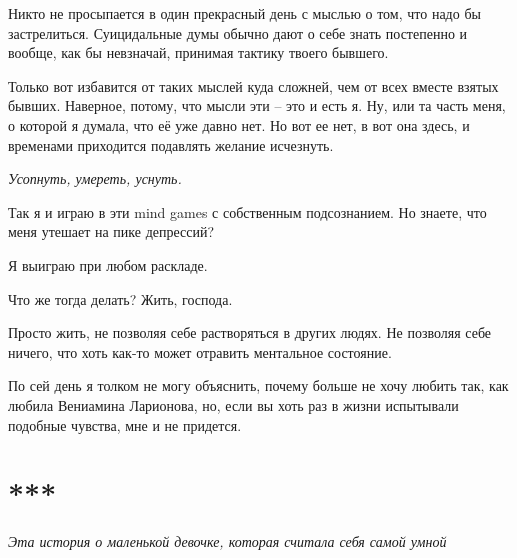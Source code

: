 \documentclass[
]{book}
\begin{document}
Никто не просыпается в один прекрасный день с мыслью о том, что надо бы застрелиться. Суицидальные думы обычно дают о себе знать постепенно и вообще, как бы невзначай, принимая тактику твоего бывшего.

Только вот избавится от таких мыслей куда сложней, чем от всех вместе взятых бывших. Наверное, потому, что мысли эти -- это и есть я. Ну, или та часть меня, о которой я думала, что её уже давно нет. Но вот ее нет, в вот она здесь, и временами приходится подавлять желание исчезнуть.

\emph{Усопнуть, умереть, уснуть.}

Так я и играю в эти mind games с собственным подсознанием. Но знаете, что меня утешает на пике депрессий?

Я выиграю при любом раскладе.

Что же тогда делать? Жить, господа.

Просто жить, не позволяя себе растворяться в других людях. Не позволяя себе ничего, что хоть как-то может отравить ментальное состояние. ⠀

По сей день я толком не могу объяснить, почему больше не хочу любить так, как любила Вениамина Ларионова, но, если вы хоть раз в жизни испытывали подобные чувства, мне и не придется.

\hypertarget{section-1}{%
\chapter*{***}\label{section-1}}

\emph{Эта история о маленькой девочке, которая считала себя самой умной}
\end{document}
